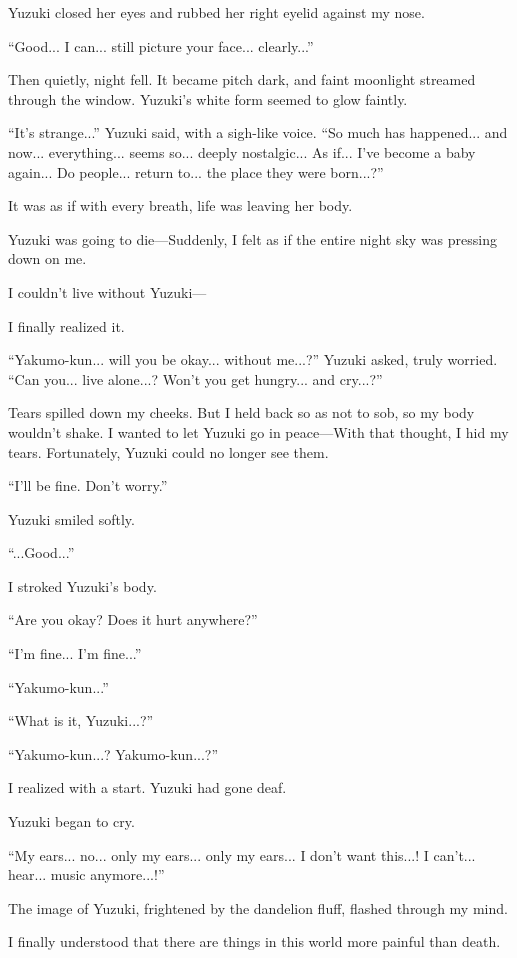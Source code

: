 \documentclass[
    a4paper,
    12pt,
    twoside,
    openany,
    UTF8,
    fontset=windows
]{ctexbook}
\begin{document}
Yuzuki closed her eyes and rubbed her right eyelid against my nose.

``Good... I can... still picture your face... clearly...''

Then quietly, night fell. It became pitch dark, and faint moonlight streamed through the window. Yuzuki's white form seemed to glow faintly.

``It's strange...'' Yuzuki said, with a sigh-like voice. ``So much has happened... and now... everything... seems so... deeply nostalgic... As if... I've become a baby again... Do people... return to... the place they were born...?''

It was as if with every breath, life was leaving her body.

Yuzuki was going to die---Suddenly, I felt as if the entire night sky was pressing down on me.

I couldn't live without Yuzuki---

I finally realized it.

``Yakumo-kun... will you be okay... without me...?'' Yuzuki asked, truly worried. ``Can you... live alone...? Won't you get hungry... and cry...?''

Tears spilled down my cheeks. But I held back so as not to sob, so my body wouldn't shake. I wanted to let Yuzuki go in peace---With that thought, I hid my tears. Fortunately, Yuzuki could no longer see them.

``I'll be fine. Don't worry.''

Yuzuki smiled softly.

``...Good...''

I stroked Yuzuki's body.

``Are you okay? Does it hurt anywhere?''

``I'm fine... I'm fine...''

``Yakumo-kun...''

``What is it, Yuzuki...?''

``Yakumo-kun...? Yakumo-kun...?''

I realized with a start. Yuzuki had gone deaf.

Yuzuki began to cry.

``My ears... no... only my ears... only my ears... I don't want this...! I can't... hear... music anymore...!''

The image of Yuzuki, frightened by the dandelion fluff, flashed through my mind.

I finally understood that there are things in this world more painful than death.
\end{document}
